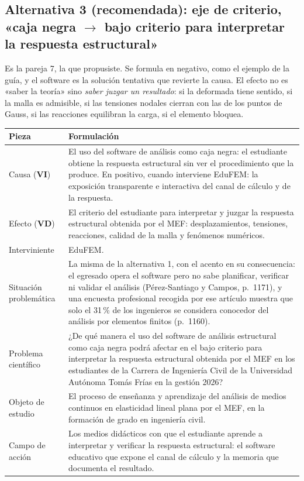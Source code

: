 \documentclass[11pt,a4paper]{article}
\newcommand{\vi}{\textbf{VI}}
\newcommand{\vd}{\textbf{VD}}
\begin{document}
\subsection{Alternativa 3 (recomendada): eje de criterio, «caja negra $\to$ bajo criterio para interpretar la respuesta estructural»}

Es la pareja 7, la que propusiste. Se formula en negativo, como el ejemplo de la guía, y el software es la solución tentativa que revierte la causa. El efecto no es «saber la teoría» sino \emph{saber juzgar un resultado}: si la deformada tiene sentido, si la malla es admisible, si las tensiones nodales cierran con las de los puntos de Gauss, si las reacciones equilibran la carga, si el elemento bloquea.

\begin{longtable}{L{3.4cm}L{12.4cm}}
\toprule
\textbf{Pieza} & \textbf{Formulación} \\
\midrule
\endhead
Causa (\vi) & El uso del software de análisis como caja negra: el estudiante obtiene la respuesta estructural sin ver el procedimiento que la produce. En positivo, cuando interviene EduFEM: la exposición transparente e interactiva del canal de cálculo y de la respuesta. \\
Efecto (\vd) & El criterio del estudiante para interpretar y juzgar la respuesta estructural obtenida por el MEF: desplazamientos, tensiones, reacciones, calidad de la malla y fenómenos numéricos. \\
Interviniente & EduFEM. \\
Situación problemática & La misma de la alternativa 1, con el acento en su consecuencia: el egresado opera el software pero no sabe planificar, verificar ni validar el análisis (Pérez-Santiago y Campos, p.~1171), y una encuesta profesional recogida por ese artículo muestra que solo el 31\,\% de los ingenieros se considera conocedor del análisis por elementos finitos (p.~1160). \\
Problema científico & ¿De qué manera el uso del software de análisis estructural como caja negra podrá afectar en el bajo criterio para interpretar la respuesta estructural obtenida por el MEF en los estudiantes de la Carrera de Ingeniería Civil de la Universidad Autónoma Tomás Frías en la gestión 2026? \\
Objeto de estudio & El proceso de enseñanza y aprendizaje del análisis de medios continuos en elasticidad lineal plana por el MEF, en la formación de grado en ingeniería civil. \\
Campo de acción & Los medios didácticos con que el estudiante aprende a interpretar y verificar la respuesta estructural: el software educativo que expone el canal de cálculo y la memoria que documenta el resultado. \\

\end{longtable}
\end{document}
